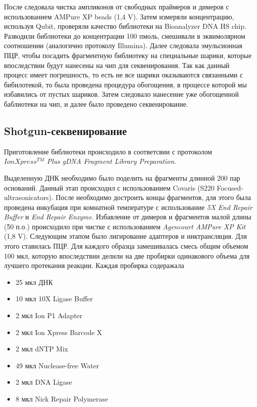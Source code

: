 После следовала чистка ампликонов от свободных праймеров и димеров с использованием AMPure XP beads (1,4 V). Затем измеряли концентрацию, используя Qubit, проверяли качество библиотеки на Bioanalyzer DNA HS chip. Разводили библиотеки до концентрации 100 пмоль, смешивали в эквимолярном соотношении (аналогично протоколу Illumina). Далее следовала эмульсионная ПЦР, чтобы посадить фрагментную библиотеку на специальные шарики, которые впоследствии будут нанесены на чип для секвенирования. Так как данный процесс имеет погрешность, то есть не все шарики оказываются связанными с бибилотекой, то была проведена процедура обогощения, в процессе которой мы избавились от пустых шариков. Затем следовало нанесение уже обогощенной баблиотеки на чип, и далее было проведено секвенирование.




\subsection{Shotgun-секвенирование}  \label{subsect1_2_4}
Приготовление библиотеки происходило в соответсвии с протоколом $IonXpress^{TM}$ \textit{Plus gDNA Fragment Library Preparation}.

Выделенную ДНК необходимо было поделить на фрагменты длинной 200 пар оснований. Данный этап происходил с использованием Covaris (S220 Focused-ultrasonicators). После необходимо достроить концы фрагментов, для этого была проведена инкубация при комнатной температуре с использование  \textit{5X End Repair Buffer} и  \textit{End Repair Enzyme}. Избавление от димеров и фрагментов малой длины (\~50 п.о.) происходило при чистке с использованием \textit{Agencourt AMPure XP Kit} (1,8 V). Следующим этапом было лигирование адаптеров и никтрансляция. Для этого ставилась ПЦР. Для каждого образца замешивалась смесь общим объемом 100 мкл, которую впоследствии делили на две пробирки одинакового объема для лучшего протекания реакции. Каждая пробирка содеражала 

\begin{itemize}
\item 25 мкл ДНК
\item 10 мкл 10X Ligase Buffer
\item 2 мкл Ion P1 Adapter
\item 2 мкл Ion Xpress Barcode X
\item 2 мкл dNTP Mix
\item 49 мкл Nuclease-free Water
\item 2 мкл DNA Ligase
\item 8 мкл Nick Repair Polymerase
\end{itemize}

